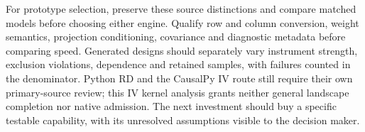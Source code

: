For prototype selection, preserve these source distinctions and compare
matched models before choosing either engine. Qualify row and column conversion,
weight semantics, projection conditioning, covariance and diagnostic metadata
before comparing speed. Generated designs should separately vary instrument
strength, exclusion violations, dependence and retained samples, with failures
counted in the denominator. Python RD and the CausalPy IV route still require
their own primary-source review; this IV kernel analysis grants neither general
landscape completion nor native admission. The next investment should buy a
specific testable capability, with its unresolved assumptions visible to the
decision maker.

